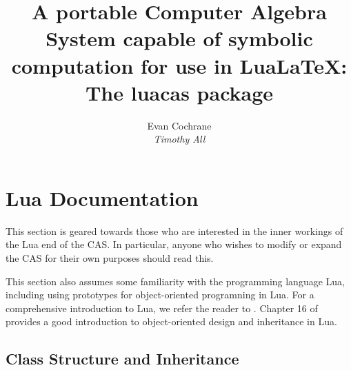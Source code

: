 \documentclass{article}
\begin{document}
\title{A portable Computer Algebra System capable of symbolic computation for use in Lua\LaTeX{}: \\  The {\ttfamily luacas} package }
\author{Evan Cochrane \\ {\itshape Timothy All}}
\date{} 

\maketitle 

\tableofcontents

















 

 

\appendix


    
\section{Lua Documentation}

This section is geared towards those who are interested in the inner workings of the Lua end of the CAS. In particular, anyone who wishes to modify or expand the CAS for their own purposes should read this.
 
This section also assumes some familiarity with the programming language Lua, including using prototypes for object-oriented programning in Lua. For a comprehensive introduction to Lua, we refer the reader to \cite{pil}. Chapter 16 of \cite{pil} provides a good introduction to object-oriented design and inheritance in Lua. 
 
 \subsection{Class Structure and Inheritance}
 
\end{document}
